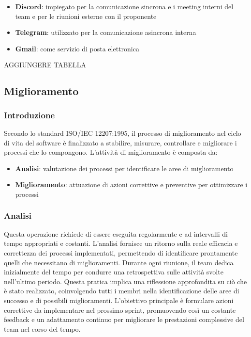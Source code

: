 \begin{itemize}
    \item \textbf{Discord}: impiegato per la comunicazione sincrona e i meeting interni del team e per le riunioni esterne con il proponente
    \item \textbf{Telegram}: utilizzato per la comunicazione asincrona interna
    \item \textbf{Gmail}: come servizio di posta elettronica
\end{itemize}

AGGIUNGERE TABELLA

\subsection{Miglioramento}
\subsubsection{Introduzione}
Secondo lo standard ISO/IEC 12207:1995, il processo di miglioramento nel ciclo di vita del software è finalizzato a stabilire, misurare, controllare e migliorare i processi che lo compongono. L’attività di miglioramento è composta da:
\begin{itemize}
    \item \textbf{Analisi}: valutazione dei processi per identificare le aree di miglioramento
    \item \textbf{Miglioramento}: attuazione di azioni correttive e preventive per ottimizzare i processi
\end{itemize}
\subsubsection{Analisi}
Questa operazione richiede di essere eseguita regolarmente e ad intervalli di tempo appropriati e costanti. L’analisi fornisce un ritorno sulla reale efficacia e correttezza dei processi implementati, permettendo di identificare prontamente quelli che necessitano di miglioramenti.
Durante ogni riunione, il team dedica inizialmente del tempo per condurre una retrospettiva sulle attività svolte nell’ultimo periodo. Questa pratica implica una riflessione approfondita su ciò che è stato realizzato, coinvolgendo tutti i membri nella identificazione delle aree di successo e di possibili miglioramenti.
L’obiettivo principale è formulare azioni correttive da implementare nel prossimo sprint, promuovendo così un costante feedback e un adattamento continuo per migliorare le prestazioni complessive del team nel corso del tempo.
